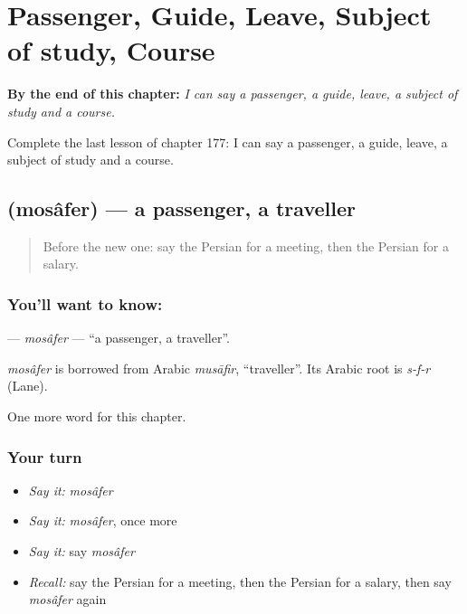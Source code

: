 
\chapter{Passenger, Guide, Leave, Subject of study, Course}
\label{ch:fa-passenger-guide-leave-subject-of-study-course}

\begin{chapteropening}
\textbf{By the end of this chapter:} \emph{I can say a passenger, a guide, leave, a subject of study and a course.}

Complete the last lesson of chapter 177: I can say a passenger, a guide, leave, a subject of study and a course.
\end{chapteropening}

\section[\texorpdfstring{\fa{مسافر} (mosâfer)}{مسافر (mosâfer)}]{ (mosâfer) — a passenger, a traveller}

\label{lesson:FA-C177-mosafer}



\begin{quote}
Before the new one: say the Persian for a meeting, then the Persian for a salary.
\end{quote}

\subsection*{You'll want to know: }
\textbf{} — \emph{mosâfer} — \textquotedblleft{}a passenger, a traveller\textquotedblright{}.

\begin{cousinweb}
\emph{mosâfer} is borrowed from Arabic \emph{musāfir}, \textquotedblleft{}traveller\textquotedblright{}. Its Arabic root is \emph{s-f-r} (Lane).
\end{cousinweb}

\begin{grammarlens}[title={What you've built}]
One more word for this chapter.
\end{grammarlens}

\subsection*{Your turn}
\begin{itemize}
\raggedright
  \item \emph{Say it:} \emph{mosâfer}
  \item \emph{Say it:} \emph{mosâfer}, once more
  \item \emph{Say it:} say \emph{mosâfer}
  \item \emph{Recall:} say the Persian for a meeting, then the Persian for a salary, then say \emph{mosâfer} again
\end{itemize}

